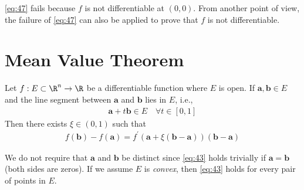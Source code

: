 \documentclass[thmcnt=section, 12pt]{elegantbook}
\begin{document}
\begin{example}
    \par \eqref{eq:47} fails because $f$ is not differentiable at $(0,0)$. From another point of view, the failure of \eqref{eq:47} can also be applied to prove that $f$ is not differentiable.
\end{example}


\section{Mean Value Theorem}


\begin{theorem} \label{thm:21}
    Let $f: E \subset \R^n \to \R$ be a differentiable function where $E$ is open. If $\mathbf{a}, \mathbf{b} \in E$ and the line segment between $\mathbf{a}$ and $\mathbf{b}$ lies in $E$, i.e., 
    \begin{align*}
        \mathbf{a} + t \mathbf{b} \in E 
        \quad \forall t \in [0,1]
    \end{align*}
    Then there exists $\xi \in (0, 1)$ such that 
    \begin{align}
        f(\mathbf{b}) - f(\mathbf{a})
        = f^\prime(\mathbf{a} + \xi (\mathbf{b} - \mathbf{a})) (\mathbf{b} - \mathbf{a})
        \label{eq:43}
    \end{align}
\end{theorem}

\begin{remark}
    We do not require that $\mathbf{a}$ and $\mathbf{b}$ be distinct since \eqref{eq:43} holds trivially if $\mathbf{a} = \mathbf{b}$ (both sides are zeros). If we assume $E$ is \textit{convex}, then \eqref{eq:43} holds for every pair of points in $E$.
\end{remark}
\end{document}
